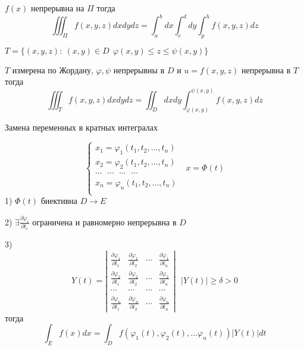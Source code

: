 \begin{block}[Следствие]
  $f(x)$ непрерывна на $\Pi$ тогда
  $$
  \iiint_{\Pi} f(x,y,z) dxdydz = \int_a^b dx \int_c^d dy \int_p^h f(x,y,z) dz
  $$
\end{block}

\begin{theorem}
  $T = \{ (x, y, z): ~ (x, y) \in D ~~ \varphi(x, y) \le z \le \psi(x, y) \}$

  $T$ измерена по Жордану, $\varphi, \psi$ непрерывны в $D$ и
  $u = f(x, y, z)$ непрерывна в $T$ тогда
  $$
  \iiint_T f(x,y,z) dxdydz = \iint_D dx dy \int_{\varphi(x,y)}^{\psi(x,y)}
  f(x,y,z)dz
  $$
\end{theorem}

\begin{title}[\Large]
  Замена переменных в кратных интегралах
\end{title}

$$
\left\{
\begin{array}{c}
  x_1 = \varphi_1(t_1, t_2, \ldots, t_n) \\
  x_2 = \varphi_2(t_1, t_2, \ldots, t_n) \\
  \cdots ~~~ \cdots ~~~ \cdots ~~~ \cdots \\
  x_n = \varphi_n(t_1, t_2, \ldots, t_n) \\
\end{array}
\right. ~~~ x = \Phi(t)
$$
1) $\Phi(t)$ биективна $D \to E$

2) $\exists \frac{\partial \varphi_i}{\partial t_i}$ ограничена и равномерно
непрерывна в $D$

3)
$$
Y(t) =
\left|
\begin{array}{cccc}
  \frac{\partial \varphi_1}{\partial t_1} &
  \frac{\partial \varphi_1}{\partial t_2} &
  \cdots &
  \frac{\partial \varphi_1}{\partial t_n} \\

  \frac{\partial \varphi_2}{\partial t_1} &
  \frac{\partial \varphi_2}{\partial t_2} &
  \cdots &
  \frac{\partial \varphi_2}{\partial t_n} \\

  \cdots & \cdots & \cdots & \cdots \\

  \frac{\partial \varphi_n}{\partial t_1} &
  \frac{\partial \varphi_n}{\partial t_2} &
  \cdots &
  \frac{\partial \varphi_n}{\partial t_n}
\end{array}
\right| ~~~ |Y(t)| \ge \delta > 0
$$
тогда
$$
\int_E f(x) dx = \int_D f(\varphi_1(t), \varphi_2(t), \ldots \varphi_n(t))
|Y(t)|dt
$$

